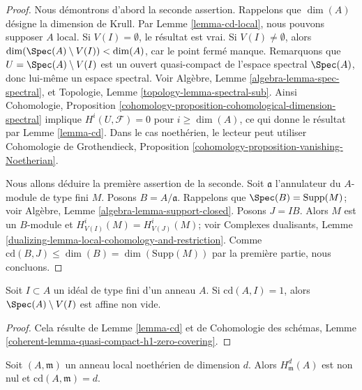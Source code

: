 \begin{proof}
Nous démontrons d'abord la seconde assertion.
Rappelons que $\dim(A)$ désigne la dimension de Krull. Par
Lemme \ref{lemma-cd-local}, nous pouvons supposer $A$ local.
Si $V(I) = \emptyset$, le résultat est vrai.
Si $V(I) \not = \emptyset$, alors
$\dim(\Spec(A) \setminus V(I)) < \dim(A)$, car
le point fermé manque. Remarquons que
$U = \Spec(A) \setminus V(I)$ est un ouvert quasi-compact
de l'espace spectral $\Spec(A)$, donc lui-même un espace spectral.
Voir Algèbre, Lemme \ref{algebra-lemma-spec-spectral}, et
Topologie, Lemme \ref{topology-lemma-spectral-sub}.
Ainsi Cohomologie, Proposition
\ref{cohomology-proposition-cohomological-dimension-spectral}
implique $H^i(U, \mathcal{F}) = 0$ pour $i \geq \dim(A)$,
ce qui donne le résultat par Lemme \ref{lemma-cd}.
Dans le cas noethérien, le lecteur peut utiliser
Cohomologie de Grothendieck, Proposition
\ref{cohomology-proposition-vanishing-Noetherian}.

\medskip\noindent
Nous allons déduire la première assertion de la seconde.
Soit $\mathfrak a$ l'annulateur du $A$-module de type fini $M$.
Posons $B = A/\mathfrak a$. Rappelons que $\Spec(B) = \text{Supp}(M)$; voir
Algèbre, Lemme \ref{algebra-lemma-support-closed}.
Posons $J = IB$. Alors $M$ est un $B$-module
et $H^i_{V(I)}(M) = H^i_{V(J)}(M)$; voir
Complexes dualisants, Lemme
\ref{dualizing-lemma-local-cohomology-and-restriction}.
Comme $\text{cd}(B, J) \leq \dim(B) = \dim(\text{Supp}(M))$
par la première partie, nous concluons.
\end{proof}

\begin{lemma}
\label{lemma-cd-is-one}
Soit $I \subset A$ un idéal de type fini d'un anneau $A$. Si
$\text{cd}(A, I) = 1$, alors $\Spec(A) \setminus V(I)$ est affine non vide.
\end{lemma}

\begin{proof}
Cela résulte de Lemme \ref{lemma-cd} et de
Cohomologie des schémas, Lemme
\ref{coherent-lemma-quasi-compact-h1-zero-covering}.
\end{proof}

\begin{lemma}
\label{lemma-cd-maximal}
Soit $(A, \mathfrak m)$ un anneau local noethérien de dimension $d$.
Alors $H^d_\mathfrak m(A)$ est non nul et $\text{cd}(A, \mathfrak m) = d$.
\end{lemma}

